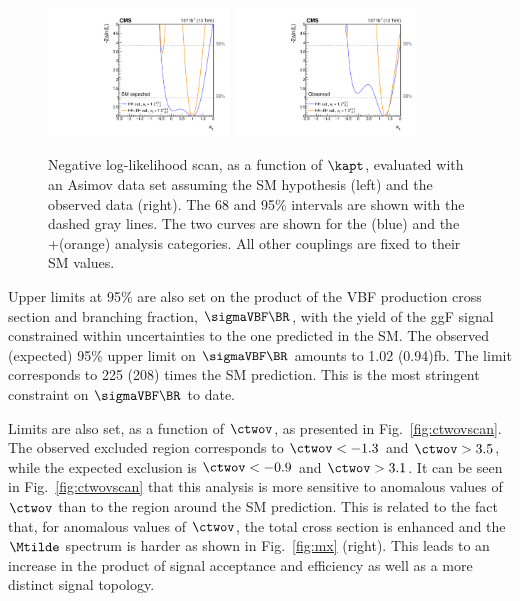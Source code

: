 \documentclass[11pt,a4paper,cmspaper,final,collab]{cms-tdr}
\begin{document}
\begin{figure}[!htb]
  \centering
\includegraphics[width=0.43\textwidth]{Figure_013-a.pdf}
\includegraphics[width=0.43\textwidth]{Figure_013-b.pdf}
  \caption{Negative log-likelihood scan, as a function of $\kapt$, evaluated with an Asimov data set assuming the SM hypothesis (left) and the observed data (right).
 The 68 and 95\% \CL intervals are shown with the dashed gray lines.
 The two curves are shown for the \HH (blue) and the \HH+\ttH (orange) analysis categories. All other couplings are fixed to their SM values.
}
\label{fig:kaptlikelihood}
\end{figure}

Upper limits at 95\% \CL are also set on the product of the \HH VBF production cross section and branching fraction, $\sigmaVBF \BR$, with the yield of the ggF \HH signal constrained within uncertainties to the one predicted in the SM.
 The observed (expected) 95\% \CL upper limit on 
 $\sigmaVBF \BR$ 
amounts to 1.02 (0.94)\unit{fb}. The limit corresponds to 225 (208) times the SM prediction. This is the most stringent constraint on
 $\sigmaVBF \BR$ 
to date. 

Limits are also set, as a function of $\ctwov$, as presented in Fig.~\ref{fig:ctwovscan}. The observed excluded region
corresponds to $\ctwov < -1.3$ and $\ctwov > 3.5$, while the expected exclusion is $\ctwov < -0.9$ and $\ctwov > 3.1$. It can be seen in Fig.~\ref{fig:ctwovscan} that this analysis is more sensitive to anomalous values of $\ctwov$ than to the region around the SM prediction. This is related to the fact that, for anomalous values of $\ctwov$, the total cross section is enhanced and the $\Mtilde$ spectrum is harder as shown in Fig.~\ref{fig:mx} (right). This leads to an
increase in the product of signal acceptance and efficiency as well as a more distinct signal topology.
\end{document}
